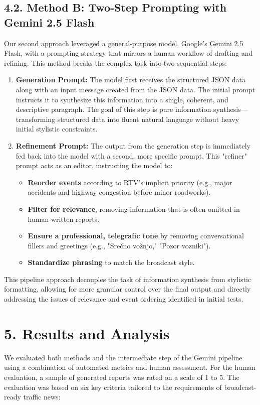\documentclass[fleqn,moreauthors,10pt]{ds_report}
\begin{document}
\subsection*{4.2. Method B: Two-Step Prompting with Gemini 2.5 Flash}
Our second approach leveraged a general-purpose model, Google's Gemini 2.5 Flash, with a prompting strategy that mirrors a human workflow of drafting and refining. This method breaks the complex task into two sequential steps:

\begin{enumerate}
\item \textbf{Generation Prompt:} The model first receives the structured JSON data along with an input message created from the JSON data. The initial prompt instructs it to synthesize this information into a single, coherent, and descriptive paragraph. The goal of this step is pure information synthesis—transforming structured data into fluent natural language without heavy initial stylistic constraints.

\item \textbf{Refinement Prompt:} The output from the generation step is immediately fed back into the model with a second, more specific prompt. This "refiner" prompt acts as an editor, instructing the model to:
\begin{itemize}
    \item \textbf{Reorder events} according to RTV's implicit priority (e.g., major accidents and highway congestion before minor roadworks).
    \item \textbf{Filter for relevance}, removing information that is often omitted in human-written reports.
    \item \textbf{Ensure a professional, telegrafic tone} by removing conversational fillers and greetings (e.g., "Srečno vožnjo," "Pozor vozniki").
    \item \textbf{Standardize phrasing} to match the broadcast style.
\end{itemize}

\end{enumerate}
This pipeline approach decouples the task of information synthesis from stylistic formatting, allowing for more granular control over the final output and directly addressing the issues of relevance and event ordering identified in initial tests.
\section*{5. Results and Analysis}
We evaluated both methods and the intermediate step of the Gemini pipeline using a combination of automated metrics and human assessment. For the human evaluation, a sample of generated reports was rated on a scale of 1 to 5. The evaluation was based on six key criteria tailored to the requirements of broadcast-ready traffic news:
\end{document}
